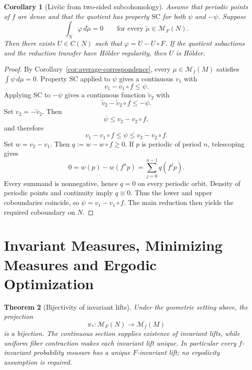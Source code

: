 \documentclass[11pt,a4paper]{article}
\newtheorem{theorem}{Theorem}[section]
\newtheorem{corollary}[theorem]{Corollary}
\newcommand{\M}{\mathcal M}
\begin{document}
\begin{corollary}[Liv\v{s}ic from two-sided subcohomology]
\label{cor:two-sided-sc-livsic}
Assume that periodic points of $f$ are dense and that the quotient has
property $\mathrm{SC}$ for both $\psi$ and $-\psi$. Suppose
\[
\int_N\varphi\,d\widetilde\mu=0
\qquad\text{for every }\widetilde\mu\in\M_F(N).
\]
Then there exists $U\in C(N)$ such that $\varphi=U-U\circ F$.
If the quotient subactions and the reduction transfer have H\"older
regularity, then $U$ is H\"older.
\end{corollary}

\begin{proof}
By Corollary~\ref{cor:average-correspondence}, every
$\mu\in\M_f(M)$ satisfies $\int\psi\,d\mu=0$. Property $\mathrm{SC}$ applied to $\psi$ gives a continuous $v_1$ with
\[
v_1-v_1\circ f\le\psi.
\]
Applying $\mathrm{SC}$ to $-\psi$ gives a continuous function $\widetilde v_2$
with
\[
\widetilde v_2-\widetilde v_2\circ f\le-\psi.
\]
Set $v_2=-\widetilde v_2$. Then
\[
\psi\le v_2-v_2\circ f,
\]
and therefore
\[
v_1-v_1\circ f\le\psi\le v_2-v_2\circ f.
\]
Set $w=v_2-v_1$. Then $q:=w-w\circ f\ge0$. If $p$ is periodic of
period $n$, telescoping gives
\[
0=w(p)-w(f^np)=\sum_{j=0}^{n-1}q(f^jp).
\]
Every summand is nonnegative, hence $q=0$ on every periodic orbit. Density
of periodic points and continuity imply $q\equiv0$. Thus the lower and
upper coboundaries coincide, so
$\psi=v_1-v_1\circ f$. The main reduction then yields the required
coboundary on $N$.
\end{proof}

\section{Invariant Measures, Minimizing Measures and Ergodic Optimization}

\begin{theorem}[Bijectivity of invariant lifts]
\label{thm:lift-bijection}
Under the geometric setting above, the projection
\[
\boxed{\pi_*:\M_F(N)\longrightarrow\M_f(M)}
\]
is a bijection. The continuous section supplies existence of invariant lifts,
while uniform fiber contraction makes each invariant lift unique. In
particular every $f$-invariant probability measure has a unique
$F$-invariant lift; no ergodicity assumption is required.
\end{theorem}
\end{document}

